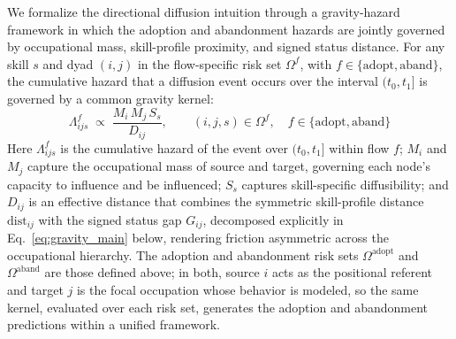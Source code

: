 \documentclass[11pt, letterpaper]{article} %
\begin{document}
We formalize the directional diffusion intuition through a gravity-hazard framework in which the adoption and abandonment hazards are jointly governed by occupational mass, skill-profile proximity, and signed status distance. For any skill $s$ and dyad $(i,j)$ in the flow-specific risk set $\Omega^{f}$, with $f \in \{\mathrm{adopt},\mathrm{aband}\}$, the cumulative hazard that a diffusion event occurs over the interval $(t_0,t_1]$ is governed by a common gravity kernel:
%
\begin{equation}
\Lambda^{f}_{ijs} \;\propto\; \frac{M_i \, M_j \, S_s}{D_{ij}}, \qquad (i,j,s)\in \Omega^{f}, \quad f \in \{\mathrm{adopt},\mathrm{aband}\}
\end{equation}
%
Here $\Lambda^{f}_{ijs}$ is the cumulative hazard of the event over $(t_0,t_1]$ within flow $f$; $M_i$ and $M_j$ capture the occupational mass of source and target, governing each node's capacity to influence and be influenced; $S_s$ captures skill-specific diffusibility; and $D_{ij}$ is an effective distance that combines the symmetric skill-profile distance $\mathrm{dist}_{ij}$ with the signed status gap $G_{ij}$, decomposed explicitly in Eq.~\ref{eq:gravity_main} below, rendering friction asymmetric across the occupational hierarchy. The adoption and abandonment risk sets $\Omega^{\mathrm{adopt}}$ and $\Omega^{\mathrm{aband}}$ are those defined above; in both, source $i$ acts as the positional referent and target $j$ is the focal occupation whose behavior is modeled, so the same kernel, evaluated over each risk set, generates the adoption and abandonment predictions within a unified framework.
 
\end{document}
